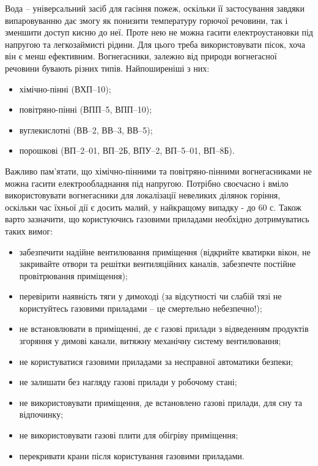 \documentclass[12pt,a4paper]{article}
\begin{document}
Вода – універсальний засіб для гасіння пожеж, оскільки її застосування завдяки випаровуванню дає змогу як понизити температуру горючої речовини, так і зменшити доступ кисню до неї. Проте нею не можна гасити електроустановки під напругою та легкозаймисті рідини. Для цього треба використовувати пісок, хоча він є менш ефективним.
Вогнегасники, залежно від природи вогнегасної речовини бувають різних типів. Найпоширеніші з них:
\begin{itemize}
\item	хімічно-пінні (ВХП–10);
\item	повітряно-пінні  (ВПП–5, ВПП–10);
\item	вуглекислотні (ВВ–2, ВВ–3, ВВ–5);
\item	порошкові (ВП–2–01, ВП–2Б, ВПУ–2, ВП–5–01, ВП–8Б).
\end{itemize}
Важливо пам’ятати, що хімічно-пінними та повітряно-пінними вогнегасниками не можна гасити електрообладнання під напругою. Потрібно своєчасно і вміло використовувати вогнегасники для локалізації невеликих ділянок горіння, оскільки час їхньої дії є досить малий, у найкращому випадку - до 60 с.
Також варто зазначити, що користуючись газовими приладами необхідно дотримуватись таких вимог:
\begin{itemize}
\item	забезпечити надійне вентилювання приміщення (відкрийте кватирки вікон, не закривайте отвори та решітки вентиляційних каналів, забезпечте постійне провітрювання приміщення);
\item	перевірити наявність тяги у димоході (за відсутності чи слабій тязі не користуйтесь газовими приладами – це смертельно небезпечно!);
\item	не встановлювати в приміщенні, де є газові прилади з відведенням продуктів згоряння у димові канали, витяжну механічну систему вентилювання;
\item	не користуватися газовими приладами за несправної автоматики безпеки;
\item	не залишати без нагляду газові прилади у робочому стані;
\item	не використовувати приміщення, де встановлено газові прилади, для сну та відпочинку;
\item	не використовувати газові плити для обігріву приміщення;
\item	перекривати крани після користування газовими приладами.
\end{itemize}
\end{document}
